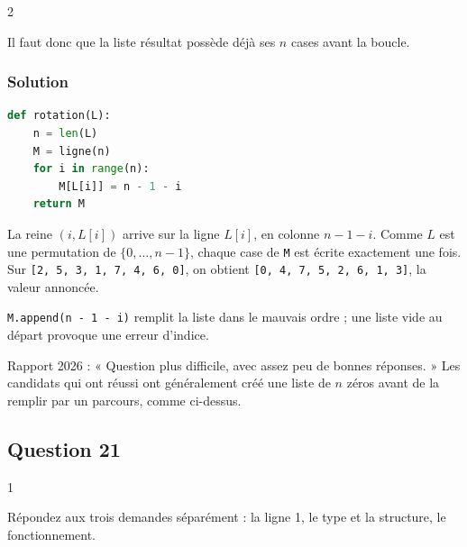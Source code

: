 \documentclass[11pt,a4paper]{article}
\begin{document}
\begin{indication}{2}

Il faut donc que la liste résultat possède déjà ses \(n\) cases avant la boucle.

\end{indication}

\hypertarget{solution-19}{%
\subsubsection{Solution}\label{solution-19}}

\begin{lstlisting}[language=Python]
def rotation(L):
    n = len(L)
    M = ligne(n)
    for i in range(n):
        M[L[i]] = n - 1 - i
    return M
\end{lstlisting}

La reine \((i, L[i])\) arrive sur la ligne \(L[i]\), en colonne \(n - 1 - i\). Comme \(L\) est une permutation de \(\{0, \dots, n-1\}\), chaque case de \texttt{M} est écrite exactement une fois. Sur \texttt{{[}2,\allowbreak{}\ 5,\allowbreak{}\ 3,\allowbreak{}\ 1,\allowbreak{}\ 7,\allowbreak{}\ 4,\allowbreak{}\ 6,\allowbreak{}\ 0{]}\allowbreak{}}, on obtient \texttt{{[}0,\allowbreak{}\ 4,\allowbreak{}\ 7,\allowbreak{}\ 5,\allowbreak{}\ 2,\allowbreak{}\ 6,\allowbreak{}\ 1,\allowbreak{}\ 3{]}\allowbreak{}}, la valeur annoncée.

\begin{piege}

\texttt{M.append(\allowbreak{}n\ -\ 1\ -\ i)\allowbreak{}} remplit la liste dans le mauvais ordre ; une liste vide au départ provoque une erreur d'indice.

\end{piege}

\begin{jury}

Rapport 2026 : « Question plus difficile, avec assez peu de bonnes réponses. » Les candidats qui ont réussi ont généralement créé une liste de \(n\) zéros avant de la remplir par un parcours, comme ci-dessus.

\end{jury}

\hypertarget{question-21}{%
\subsection{Question 21}\label{question-21}}

\begin{indication}{1}

Répondez aux trois demandes séparément : la ligne 1, le type et la structure, le fonctionnement.

\end{indication}
\end{document}
